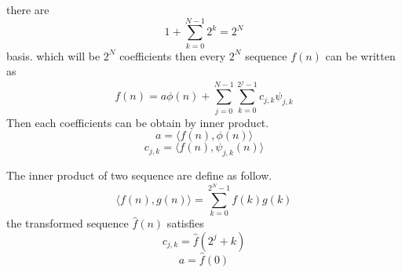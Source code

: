 \documentclass{beamer}
\begin{document}
\begin{frame}
    there are
    \[
        1+\sum_{k=0}^{N-1}2^k=2^N
    \]
    basis.
    which will be \(2^N\) coefficients
    then every \(2^N\) sequence \(f(n)\) can be written as
    \[
        f(n)=a\phi(n)+\sum_{j=0}^{N-1}\sum_{k=0}^{2^j-1}c_{j,k}\psi_{j,k}
    \]
    Then each coefficients can be obtain by inner product.
    \[
        a=\langle f(n),\phi(n)\rangle
    \]
    \[
        c_{j,k}=\langle f(n),\psi_{j,k}(n)\rangle
    \]
\end{frame}
\begin{frame}
    The inner product of two sequence are define as follow.
    \[
        \langle f(n),g(n)\rangle=\sum_{k=0}^{2^N-1}f(k)g(k)
    \]
    the transformed sequence \(\hat{f}(n)\)
    satisfies
    \[
        c_{j,k}=\hat{f}(2^j+k)
    \]
    \[
        a=\hat{f}(0)
    \]
\end{frame}
\end{document}

